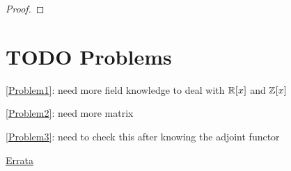 \documentclass[11pt]{article}
\begin{document}
\begin{proof}
    
\end{proof}

\section{{\bfseries\sffamily TODO} Problems}
\label{sec:org7cd0508}
\ref{Problem1}: need more field knowledge to deal with \(\mathbb{R}[x]\) and \(\mathbb{Z}[x]\)

\ref{Problem2}: need more matrix

\ref{Problem3}: need to check this after knowing the adjoint functor

\href{https://mathoverflow.net/questions/42241/errata-for-atiyah-macdonald}{Errata}
\end{document}
